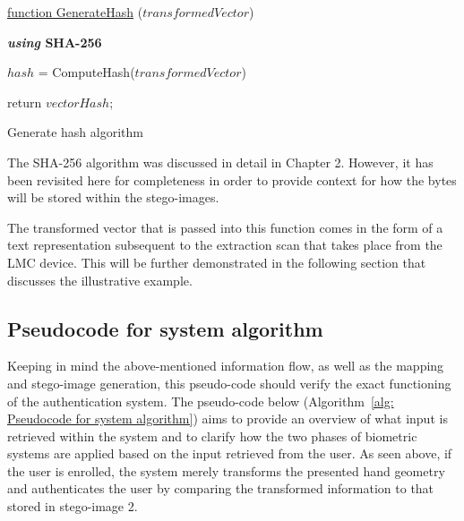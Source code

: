 \begin{algorithm}
     
     \underline{function GenerateHash} ($transformedVector$)\;
     
     \textbf{\textit{using} SHA-256}{
        $hash$ = ComputeHash($transformedVector$)\;
        
    
     }
     return $vectorHash$;
     \caption{Generate hash algorithm}
     \label{alg: Generate hash algorithm}
     
\end{algorithm}


The SHA-256 algorithm was discussed in detail in Chapter 2. However, it has been revisited here for completeness in order to provide context for how the bytes will be stored within the stego-images. 

The transformed vector that is passed into this function comes in the form of a text representation subsequent to the extraction scan that takes place from the LMC device. This will be further demonstrated in the following section that discusses the illustrative example.


\subsection{Pseudocode for system algorithm}

Keeping in mind the above-mentioned information flow, as well as the mapping and stego-image generation, this pseudo-code should verify the exact functioning of the authentication system.
The pseudo-code below (Algorithm~\ref{alg: Pseudocode for system algorithm}) aims to provide an overview of what input is retrieved within the system and to clarify how the two phases of biometric systems are applied based on the input retrieved from the user. As seen above, if the user is enrolled, the system merely transforms the presented hand geometry and authenticates the user by comparing the transformed information to that stored in stego-image 2.

